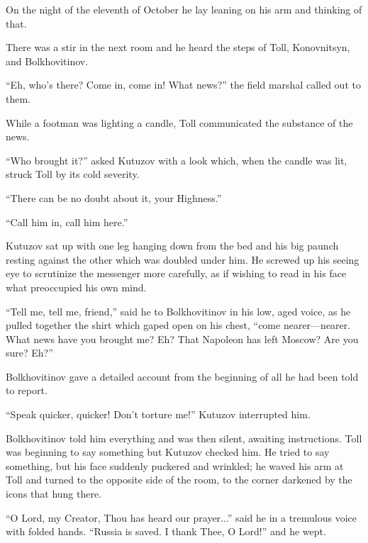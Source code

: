 On the night of the eleventh of October he lay leaning on his arm
and thinking of that.

There was a stir in the next room and he heard the steps of Toll,
Konovnitsyn, and Bolkhovitinov.

``Eh, who's there? Come in, come in! What news?'' the field
marshal called out to them.

While a footman was lighting a candle, Toll communicated the
substance of the news.

``Who brought it?'' asked Kutuzov with a look which, when the
candle was lit, struck Toll by its cold severity.

``There can be no doubt about it, your Highness.''

``Call him in, call him here.''

Kutuzov sat up with one leg hanging down from the bed and his big
paunch resting against the other which was doubled under him. He
screwed up his seeing eye to scrutinize the messenger more
carefully, as if wishing to read in his face what preoccupied his
own mind.

``Tell me, tell me, friend,'' said he to Bolkhovitinov in his
low, aged voice, as he pulled together the shirt which gaped open
on his chest, ``come nearer---nearer. What news have you brought
me?  Eh? That Napoleon has left Moscow? Are you sure? Eh?''

Bolkhovitinov gave a detailed account from the beginning of all
he had been told to report.

``Speak quicker, quicker! Don't torture me!'' Kutuzov interrupted
him.

Bolkhovitinov told him everything and was then silent, awaiting
instructions. Toll was beginning to say something but Kutuzov
checked him. He tried to say something, but his face suddenly
puckered and wrinkled; he waved his arm at Toll and turned to the
opposite side of the room, to the corner darkened by the icons
that hung there.

``O Lord, my Creator, Thou has heard our prayer...'' said he in a
tremulous voice with folded hands. ``Russia is saved. I thank
Thee, O Lord!'' and he wept.


